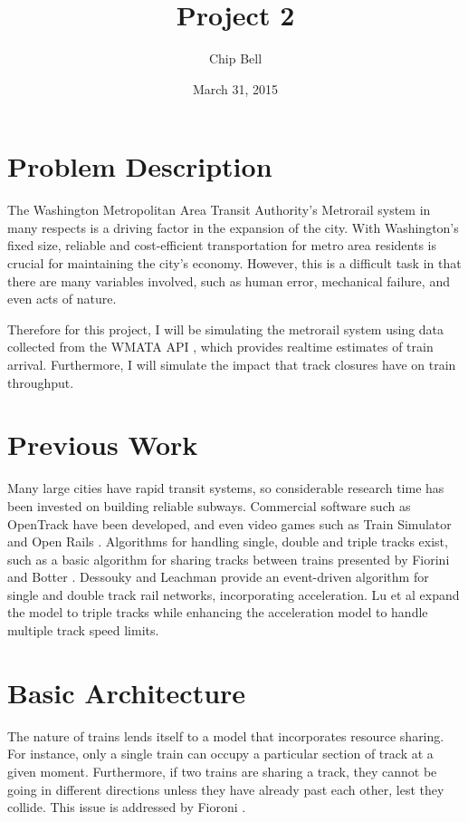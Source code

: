 \documentclass[a4paper,12pt]{article}
\begin{document}
\title{Project 2}
\author{Chip Bell}
\date{March 31, 2015}
\maketitle

\section{Problem Description}
The Washington Metropolitan Area Transit Authority's Metrorail system in many respects is a driving factor in the
expansion of the city. With Washington's fixed size, reliable and cost-efficient transportation for metro area
residents is crucial for maintaining the city's economy. However, this is a difficult task in that there are many
variables involved, such as human error, mechanical failure, and even acts of nature.

Therefore for this project, I will be simulating the metrorail system using data collected from the WMATA API
\cite{wmataapi}, which provides realtime estimates of train arrival. Furthermore, I will simulate the impact that track
closures have on train throughput.

\section{Previous Work}
Many large cities have rapid transit systems, so considerable research time has been invested on building reliable
subways. Commercial software such as OpenTrack \cite{opentrack} have been developed, and even video games such as Train
Simulator \cite{trainsimulator} and Open Rails \cite{openrails}. Algorithms for handling single, double and triple tracks exist,
such as a basic
algorithm for sharing tracks between trains presented by Fiorini and Botter \cite{fioroni}. Dessouky and Leachman
\cite{dessouky_leachman_95} provide an event-driven algorithm for single and double track rail networks, incorporating
acceleration. Lu et al \cite{quan_lu} expand the model to triple tracks while enhancing the acceleration model to
handle multiple track speed limits.

\section{Basic Architecture}
The nature of trains lends itself to a model that incorporates resource sharing. For instance, only a single train can
occupy a particular section of track at a given moment. Furthermore, if two trains are sharing a track, they cannot
be going in different directions unless they have already past each other, lest they collide. This issue is addressed
by Fioroni \cite{fioroni}.
\end{document}

